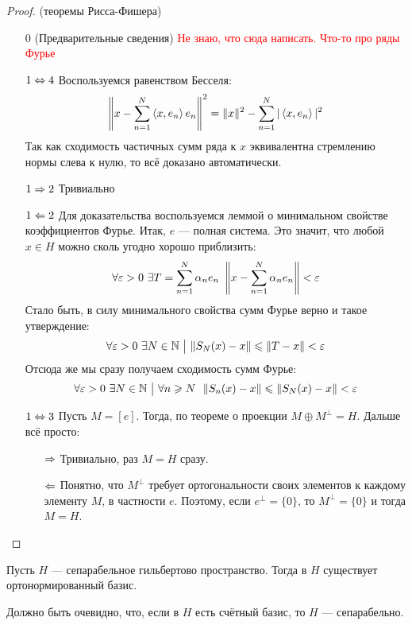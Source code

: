 \begin{proof} (теоремы Рисса-Фишера)
	\begin{itemize}
		\item[$0$] (Предварительные сведения) \textcolor{red}{Не знаю, что сюда написать. Что-то про ряды Фурье}
		
		\item[$1 \Leftrightarrow  4$] Воспользуемся равенством Бесселя:
		\[
			\left\|x - \sum_{n = 1}^N \left\langle x, e_n\right\rangle e_n\right\|^2 = \|x\|^2 - \sum_{n = 1}^N |\left\langle x, e_n\right\rangle|^2
		\]
		Так как сходимость частичных сумм ряда к $x$ эквивалентна стремлению нормы слева к нулю, то всё доказано автоматически.
		
		\item[$1 \Rightarrow 2$] Тривиально
		
		\item[$1 \Leftarrow 2$] Для доказательства воспользуемся леммой о минимальном свойстве коэффициентов Фурье. Итак, $e$ --- полная система. Это значит, что любой $x \in H$ можно сколь угодно хорошо приблизить:
		\[
			\forall \varepsilon > 0\ \exists T = \sum_{n = 1}^N \alpha_n e_n\ \left\|x - \sum_{n = 1}^N \alpha_n e_n\right\| < \varepsilon
		\]
		Стало быть, в силу минимального свойства сумм Фурье верно и такое утверждение:
		\[
			\forall \varepsilon > 0\ \exists N \in \mathbb{N} \ \big|\  \|S_N(x) - x\| \leqslant \|T - x\| < \varepsilon
		\]
		Отсюда же мы сразу получаем сходимость сумм Фурье:
		\[
			\forall \varepsilon > 0\ \exists N \in \mathbb{N} \ \big|\  \forall n \geqslant N\ \ \|S_n(x) - x\| \leqslant \|S_N(x) - x\| < \varepsilon
		\]
	
		\item[$1 \Leftrightarrow 3$] Пусть $M = [e]$. Тогда, по теореме о проекции $M \oplus M^\bot = H$. Дальше всё просто:
		\begin{itemize}
			\item[$\Rightarrow$] Тривиально, раз $M = H$ сразу.
			
			\item[$\Leftarrow$] Понятно, что $M^\bot$ требует ортогональности своих элементов к каждому элементу $M$, в частности $e$. Поэтому, если $e^\bot = \{0\}$, то $M^\bot = \{0\}$ и тогда $M = H$.
		\end{itemize}
	\end{itemize}
\end{proof}

\begin{theorem}
	Пусть $H$ --- сепарабельное гильбертово пространство. Тогда в $H$ существует ортонормированный базис.
\end{theorem}

\begin{note}
	Должно быть очевидно, что, если в $H$ есть счётный базис, то $H$ --- сепарабельно.
\end{note}

